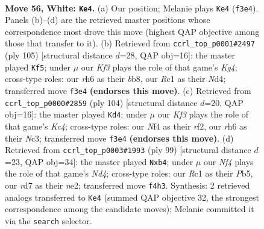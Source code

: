 \documentclass[11pt]{article}
\begin{document}
\clearpage

\begin{figure}[p]\centering
\begin{subfigure}{0.46\textwidth}\centering
\resizebox{\linewidth}{!}{%
\newchessgame
\chessboard[
  setfen={5k2/3r1p2/7r/p7/5N2/1P1p1K2/R6P/2R5 w - - 0 56},
  showmover=false,
  pgfstyle=straightmove, color=movearrow, markmove={f3-e4}
]}
\caption{}
\end{subfigure}\hfill
\begin{subfigure}{0.46\textwidth}\centering
\resizebox{\linewidth}{!}{%
\newchessgame
\chessboard[
  setfen={1B6/1p6/1R6/6k1/1P1n2p1/6P1/1Pr5/5K2 b - - 8 53},
  showmover=false,
  pgfstyle=straightmove, color=movearrow, markmove={g5-f5}
]}
\caption{}
\end{subfigure}
\\[4pt]
\begin{subfigure}{0.46\textwidth}\centering
\resizebox{\linewidth}{!}{%
\newchessgame
\chessboard[
  setfen={n7/P4pk1/2p5/7R/1PK5/2N2P2/5r1p/8 w - - 13 53},
  showmover=false,
  pgfstyle=straightmove, color=movearrow, markmove={c4-d4}
]}
\caption{}
\end{subfigure}\hfill
\begin{subfigure}{0.46\textwidth}\centering
\resizebox{\linewidth}{!}{%
\newchessgame
\chessboard[
  setfen={5k2/5p2/p6R/1p1nP3/1P6/3r3P/4N1PK/8 b - - 0 50},
  showmover=false,
  pgfstyle=straightmove, color=movearrow, markmove={d5-b4}
]}
\caption{}
\end{subfigure}
\caption{\textbf{Move 56, White: \texttt{Ke4}.} (a) Our position; Melanie plays \texttt{Ke4} (\texttt{f3e4}). Panels (b)--(d) are the retrieved master positions whose correspondence most drove this move (highest QAP objective among those that transfer to it). (b) Retrieved from \texttt{ccrl\_top\_p0001\#2497} (ply 105) [structural distance $d$=28, QAP obj=16]: the master played \texttt{Kf5}; under $\mu$ our \emph{Kf3} plays the role of that game's \emph{Kg4}; cross-type roles: our \emph{r}h6 as their \emph{b}b8, our \emph{R}c1 as their \emph{N}d4; transferred move \texttt{f3e4} \textbf{(endorses this move)}. (c) Retrieved from \texttt{ccrl\_top\_p0000\#2859} (ply 104) [structural distance $d$=20, QAP obj=16]: the master played \texttt{Kd4}; under $\mu$ our \emph{Kf3} plays the role of that game's \emph{Kc4}; cross-type roles: our \emph{N}f4 as their \emph{r}f2, our \emph{r}h6 as their \emph{N}c3; transferred move \texttt{f3e4} \textbf{(endorses this move)}. (d) Retrieved from \texttt{ccrl\_top\_p0003\#1993} (ply 99) [structural distance $d$=23, QAP obj=34]: the master played \texttt{Nxb4}; under $\mu$ our \emph{Nf4} plays the role of that game's \emph{Nd4}; cross-type roles: our \emph{R}c1 as their \emph{P}b5, our \emph{r}d7 as their \emph{n}e2; transferred move \texttt{f4h3}. Synthesis: 2 retrieved analogs transferred to \texttt{Ke4} (summed QAP objective 32, the strongest correspondence among the candidate moves); Melanie committed it via the \texttt{search} selector.}
\label{fig:thought-m110}
\end{figure}
\end{document}
